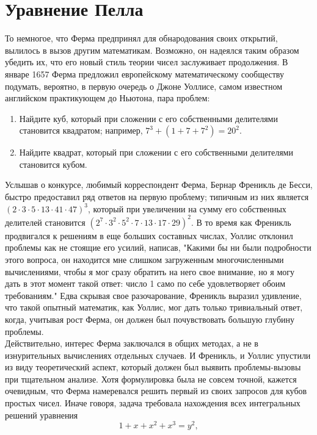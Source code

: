 \documentclass[11pt]{article}
\begin{document}
\section{Уравнение Пелла}

То немногое, что Ферма предпринял для обнародования своих открытий, вылилось в вызов другим математикам. Возможно, он надеялся таким образом убедить их, что его новый стиль теории чисел заслуживает продолжения. В январе 1657 Ферма предложил европейскому математическому сообществу подумать, вероятно, в первую очередь о Джоне Уоллисе, самом известном английском практикующем до Ньютона, пара проблем: \\
\begin{enumerate}  
\item Найдите куб, который при сложении с его собственными делителями становится квадратом; например, $7^{3}+(1+7+7^{2})=20^{2}$.
\item Найдите квадрат, который при сложении с его собственными делителями становится кубом.
\end{enumerate}
Услышав о конкурсе, любимый корреспондент Ферма, Бернар Френикль де Бесси, быстро предоставил ряд ответов на первую проблему; типичным из них является $(2\cdot3\cdot5\cdot13\cdot41\cdot47)^{3}$, который при увеличении на сумму его собственных делителей становится $(2^{7}\cdot3^{2}\cdot5^{2}\cdot7\cdot13\cdot17\cdot29)^{2}$. В то время как Френикль продвигался к решениям в еще больших составных числах, Уоллис отклонил проблемы как не стоящие его усилий, написав, "Какими бы ни были подробности этого вопроса, он находится мне слишком загруженным многочисленными вычислениями, чтобы я мог сразу обратить на него свое внимание, но я могу дать в этот момент такой ответ: число 1 само по себе удовлетворяет обоим требованиям." Едва скрывая свое разочарование, Френикль выразил удивление, что такой опытный математик, как Уоллис, мог дать только тривиальный ответ, когда, учитывая рост Ферма, он должен был почувствовать большую глубину проблемы.\\
Действительно, интерес Ферма заключался в общих методах, а не в изнурительных вычислениях отдельных случаев. И Френикль, и Уоллис упустили из виду теоретический аспект, который должен был выявить проблемы-вызовы при тщательном анализе. Хотя формулировка была не совсем точной, кажется очевидным, что Ферма намеревался решить первый из своих запросов для кубов простых чисел. Иначе говоря, задача требовала нахождения всех интегральных решений уравнения $$1+x+x^{2}+x^{3}=y^{2},$$ \\ 
\end{document}
